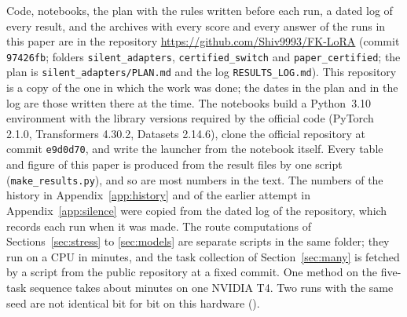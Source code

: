 Code, notebooks, the plan with the rules written before each run, a dated log of every result, and
the archives with every score and every answer of the runs in this paper are in the repository
\url{https://github.com/Shiv9993/FK-LoRA} (commit \texttt{97426fb}; folders
\texttt{silent\_adapters}, \texttt{certified\_switch} and \texttt{paper\_certified}; the plan is
\texttt{silent\_adapters/PLAN.md} and the log \texttt{RESULTS\_LOG.md}). This repository is a copy of the one
in which the work was done; the dates in the plan and in the log are those written there at the time. The notebooks
build a Python~3.10 environment with the library versions required by the official code
(PyTorch 2.1.0, Transformers 4.30.2, Datasets 2.14.6), clone the official repository at commit
\texttt{e9d0d70}, and write the launcher from the notebook itself. Every table and figure of this
paper is produced from the result files by one script (\texttt{make\_results.py}), and so are most
numbers in the text. The numbers of the history in Appendix~\ref{app:history} and of the earlier
attempt in Appendix~\ref{app:silence} were copied from the dated log of the repository, which
records each run when it was made. The route computations
of Sections~\ref{sec:stress} to \ref{sec:models} are separate scripts in the same folder; they run
on a CPU in minutes, and the task collection of Section~\ref{sec:many} is fetched by a script from
the public repository at a fixed commit. One method on the five-task sequence takes about
\FiveCertMinutes{} minutes on one NVIDIA T4. Two runs with the same seed are not identical bit for
bit on this hardware (\fivefull{}).
